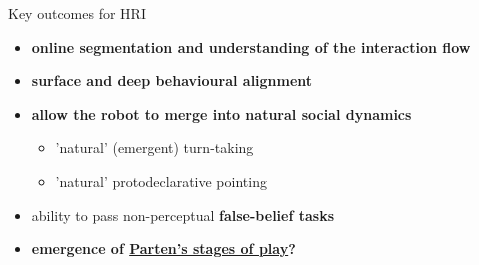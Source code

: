 \documentclass[compress]{beamer}
\begin{document}
\begin{frame}{Key outcomes for HRI}

    \begin{itemize}

        \item {\bf online segmentation and understanding of the interaction
            flow}

        \item {\bf surface and deep behavioural alignment}


        \item {\bf allow the robot to merge into natural social dynamics}
            \begin{itemize}
                \item 'natural' (\ie emergent) turn-taking
                \item 'natural' protodeclarative pointing
            \end{itemize}

    \end{itemize}

    \pause
    \begin{itemize}
        \item ability to pass non-perceptual {\bf false-belief tasks}

        \item {\bf emergence of \hyperlink{parten}{Parten's stages of
            play}?}


    \end{itemize}

\end{frame}

\end{document}
